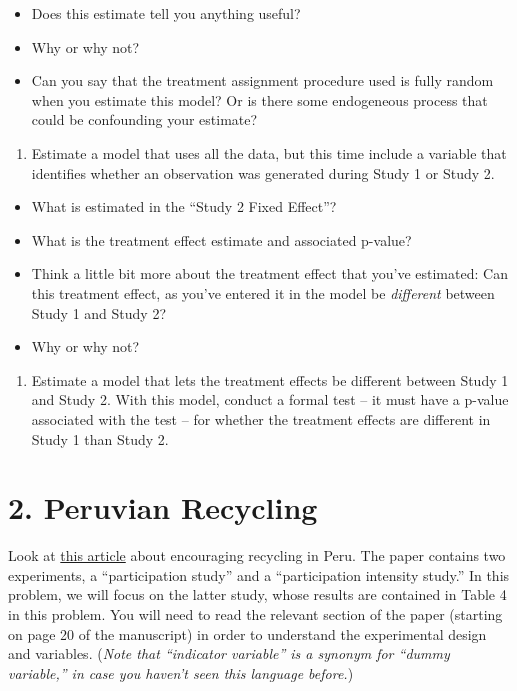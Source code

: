 \documentclass[
]{article}
\providecommand{\tightlist}{%
  \setlength{\itemsep}{0pt}\setlength{\parskip}{0pt}}
\begin{document}
\begin{itemize}
\tightlist
\item
  Does this estimate tell you anything useful?
\item
  Why or why not?
\item
  Can you say that the treatment assignment procedure used is fully
  random when you estimate this model? Or is there some endogeneous
  process that could be confounding your estimate?
\end{itemize}

\begin{enumerate}
\def\labelenumi{\arabic{enumi}.}
\setcounter{enumi}{5}
\tightlist
\item
  Estimate a model that uses all the data, but this time include a
  variable that identifies whether an observation was generated during
  Study 1 or Study 2.
\end{enumerate}

\begin{itemize}
\tightlist
\item
  What is estimated in the ``Study 2 Fixed Effect''?
\item
  What is the treatment effect estimate and associated p-value?
\item
  Think a little bit more about the treatment effect that you've
  estimated: Can this treatment effect, as you've entered it in the
  model be \emph{different} between Study 1 and Study 2?
\item
  Why or why not?
\end{itemize}

\begin{enumerate}
\def\labelenumi{\arabic{enumi}.}
\setcounter{enumi}{6}
\tightlist
\item
  Estimate a model that lets the treatment effects be different between
  Study 1 and Study 2. With this model, conduct a formal test -- it must
  have a p-value associated with the test -- for whether the treatment
  effects are different in Study 1 than Study 2.
\end{enumerate}

\hypertarget{peruvian-recycling}{%
\section{2. Peruvian Recycling}\label{peruvian-recycling}}

Look at \href{./readings/recycling_peru.pdf}{this article} about
encouraging recycling in Peru. The paper contains two experiments, a
``participation study'' and a ``participation intensity study.'' In this
problem, we will focus on the latter study, whose results are contained
in Table 4 in this problem. You will need to read the relevant section
of the paper (starting on page 20 of the manuscript) in order to
understand the experimental design and variables. (\emph{Note that
``indicator variable'' is a synonym for ``dummy variable,'' in case you
haven't seen this language before.})
\end{document}
